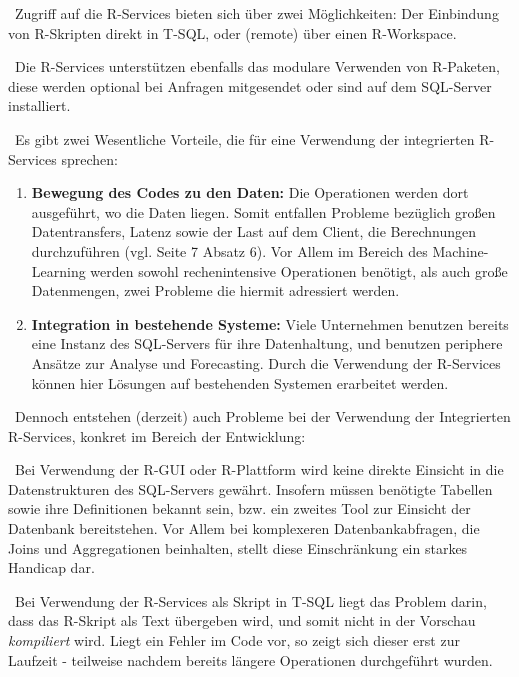 ~\newline Zugriff auf die R-Services bieten sich über zwei Möglichkeiten: Der Einbindung von R-Skripten direkt in T-SQL, oder (remote) über einen R-Workspace. 

~\newline Die R-Services unterstützen ebenfalls das modulare Verwenden von R-Paketen, diese werden optional bei Anfragen mitgesendet oder sind auf dem SQL-Server installiert. 

~\newline Es gibt zwei Wesentliche Vorteile, die für eine Verwendung der integrierten R-Services sprechen:

\begin{enumerate}
	\item \textbf{Bewegung des Codes zu den Daten:} Die Operationen werden dort ausgeführt, wo die Daten liegen. Somit entfallen Probleme bezüglich großen Datentransfers, Latenz sowie der Last auf dem Client, die Berechnungen durchzuführen (vgl. \cite{SQLData} Seite 7 Absatz 6). Vor Allem im Bereich des Machine-Learning werden sowohl rechenintensive Operationen benötigt, als auch große Datenmengen, zwei Probleme die hiermit adressiert werden. 
	\item \textbf{Integration in bestehende Systeme:} Viele Unternehmen benutzen bereits eine Instanz des SQL-Servers für ihre Datenhaltung, und benutzen periphere Ansätze zur Analyse und Forecasting. Durch die Verwendung der R-Services können hier Lösungen auf bestehenden Systemen erarbeitet werden. 
\end{enumerate}

~\newline Dennoch entstehen (derzeit) auch Probleme bei der Verwendung der Integrierten R-Services, konkret im Bereich der Entwicklung: 

~\newline Bei Verwendung der R-GUI oder R-Plattform wird keine direkte Einsicht in die Datenstrukturen des SQL-Servers gewährt. Insofern müssen benötigte Tabellen sowie ihre Definitionen bekannt sein, bzw. ein zweites Tool zur Einsicht der Datenbank bereitstehen. Vor Allem bei komplexeren Datenbankabfragen, die Joins und Aggregationen beinhalten, stellt diese Einschränkung ein starkes Handicap dar. 

~\newline Bei Verwendung der R-Services als Skript in T-SQL liegt das Problem darin, dass das R-Skript als Text übergeben wird, und somit nicht in der Vorschau \textit{kompiliert} wird. Liegt ein Fehler im Code vor, so zeigt sich dieser erst zur Laufzeit - teilweise nachdem bereits längere Operationen durchgeführt wurden. 

